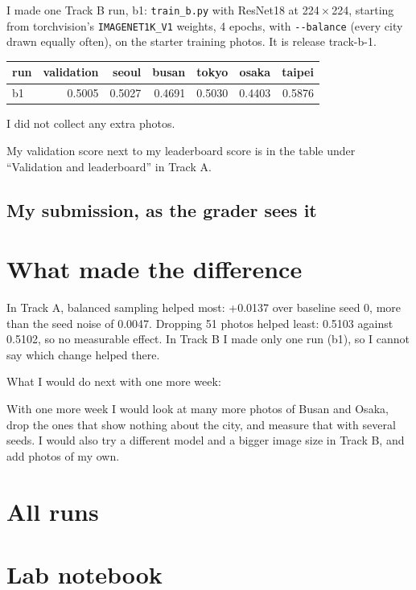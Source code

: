 \documentclass[11pt]{article}
\begin{document}
I made one Track B run, b1: \texttt{train\_b.py} with ResNet18 at
224\,$\times$\,224, starting from torchvision's \texttt{IMAGENET1K\_V1}
weights, 4 epochs, with \texttt{-{}-balance} (every city drawn equally often),
on the starter training photos. It is release track-b-1.

\begin{center}\footnotesize
\begin{tabular}{lrrrrrr}
\toprule
run & validation & seoul & busan & tokyo & osaka & taipei \\
\midrule
b1 & 0.5005 & 0.5027 & 0.4691 & 0.5030 & 0.4403 & 0.5876 \\
\bottomrule
\end{tabular}
\end{center}

I did not collect any extra photos.

My validation score next to my leaderboard score is in the table under
``Validation and leaderboard'' in Track A.

\subsection*{My submission, as the grader sees it}

\section*{What made the difference}

In Track A, balanced sampling helped most: +0.0137 over baseline seed 0, more than the seed noise of 0.0047. Dropping 51 photos helped least: 0.5103 against 0.5102, so no measurable effect. In Track B I made only one run (b1), so I cannot say which change helped there.

What I would do next with one more week:

With one more week I would look at many more photos of Busan and Osaka, drop the ones that show nothing about the city, and measure that with several seeds. I would also try a different model and a bigger image size in Track B, and add photos of my own.

\section*{All runs}

\section*{Lab notebook}
\end{document}
